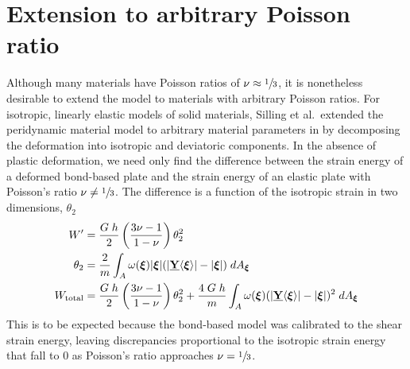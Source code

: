 \documentclass[preprint,review,12pt]{elsarticle}
\newcommand\vstate[3]{%
	\mathbf{\underline{#1}}%
	\ifstrempty{#2}{}{[#2]}%
	\ifstrempty{#3}{}{\langle #3 \rangle}}
\begin{document}
\section{Extension to arbitrary Poisson ratio}
Although many materials have Poisson ratios of \(\nu\approx \sfrac{1}{3}\), it is nonetheless desirable to extend the model to materials with arbitrary Poisson ratios.  For isotropic, linearly elastic models of solid materials, Silling et al.\ extended the peridynamic material model to arbitrary material parameters in \cite{silling2007peridynamic} by decomposing the deformation into isotropic and deviatoric components.  In the absence of plastic deformation, we need only find the difference between the strain energy of a deformed bond-based plate and the strain energy of an elastic plate with Poisson's ratio \(\nu \neq \sfrac{1}{3}\).  The difference is a function of the isotropic strain in two dimensions, \(\theta_2\)
%
\begin{align}
    W' &= \frac{G\;h}{2}\left(\frac{3\nu-1}{1-\nu}\right)\theta_2^2 \notag \\
    \theta_2 &= \frac{2}{m}\int_A \omega(\boldsymbol{\xi})|\boldsymbol{\xi}|(|\vstate{Y}{}{\boldsymbol{\xi}}|-|\boldsymbol{\xi}|)\;dA_{\boldsymbol{\xi}} \notag \\
    W_\text{total} &= \frac{G\;h}{2}\left(\frac{3\nu-1}{1-\nu}\right)\theta_2^2 + \frac{4\;G\;h}{m}\int_A \omega(\boldsymbol{\xi})(|\vstate{Y}{}{\boldsymbol{\xi}}|-|\boldsymbol{\xi}|)^2\;dA_{\boldsymbol{\xi}}\notag
\end{align}
%
This is to be expected because the bond-based model was calibrated to the shear strain energy, leaving discrepancies proportional to the isotropic strain energy that fall to 0 as Poisson's ratio approaches \(\nu = \sfrac{1}{3}\).
\end{document}
